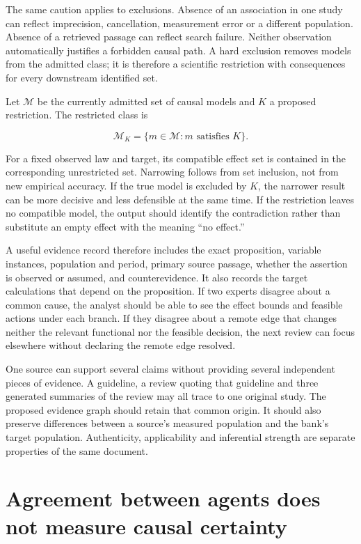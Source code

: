 The same caution applies to exclusions. Absence of an association in one
study can reflect imprecision, cancellation, measurement error or a
different population. Absence of a retrieved passage can reflect search
failure. Neither observation automatically justifies a forbidden causal
path. A hard exclusion removes models from the admitted class; it is
therefore a scientific restriction with consequences for every
downstream identified set.

Let \(\mathcal M\) be the currently admitted set of causal models and
\(K\) a proposed restriction. The restricted class is

\[
 \mathcal M_K=\{m\in\mathcal M:m\text{ satisfies }K\}.
\]

For a fixed observed law and target, its compatible effect set is
contained in the corresponding unrestricted set. Narrowing follows from
set inclusion, not from new empirical accuracy. If the true model is
excluded by \(K\), the narrower result can be more decisive and less
defensible at the same time. If the restriction leaves no compatible
model, the output should identify the contradiction rather than
substitute an empty effect with the meaning ``no effect.''

A useful evidence record therefore includes the exact proposition,
variable instances, population and period, primary source passage,
whether the assertion is observed or assumed, and counterevidence. It
also records the target calculations that depend on the proposition. If
two experts disagree about a common cause, the analyst should be able to
see the effect bounds and feasible actions under each branch. If they
disagree about a remote edge that changes neither the relevant
functional nor the feasible decision, the next review can focus
elsewhere without declaring the remote edge resolved.

One source can support several claims without providing several
independent pieces of evidence. A guideline, a review quoting that
guideline and three generated summaries of the review may all trace to
one original study. The proposed evidence graph should retain that
common origin. It should also preserve differences between a source's
measured population and the bank's target population. Authenticity,
applicability and inferential strength are separate properties of the
same document.

\hypertarget{agreement-between-agents-does-not-measure-causal-certainty}{%
\section{Agreement between agents does not measure causal
certainty}\label{agreement-between-agents-does-not-measure-causal-certainty}}

